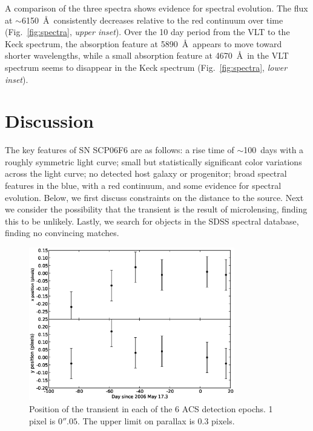 A comparison of the three spectra shows evidence for spectral evolution.
The flux at 
$\sim$6150~\AA\ consistently decreases relative to the red continuum over time
(Fig.~\ref{fig:spectra}, \emph{upper inset}).
Over the 10 day period from the VLT to the Keck spectrum, 
the absorption feature at 5890~\AA\ appears to move toward shorter wavelengths,
while a small absorption feature at 4670~\AA\ in the VLT spectrum 
seems to disappear in the Keck spectrum
(Fig.~\ref{fig:spectra}, \emph{lower inset}).


\section{Discussion} \label{sec:f6_discussion}

The key features of SN SCP06F6 are as follows: a rise time of
$\sim$100~days with a roughly symmetric light curve; small but
statistically significant color variations across the light curve; no
detected host galaxy or progenitor; broad spectral features in the
blue, with a red continuum, and some evidence for spectral evolution.
Below, we first discuss constraints on the distance to the source.
Next we consider the possibility that the transient is the result of
microlensing, finding this to be unlikely.  Lastly, we search for
objects in the SDSS spectral database, finding no convincing matches.

\begin{figure}[tbh]
\begin{center}
\includegraphics[width=0.8\textwidth]{figures/scp06f6/propmotion.eps}
\end{center}
\caption[Proper motion of SN SCP06F6]{Position of the transient in
  each of the 6 ACS detection epochs.  1 pixel is $0''.05$. The upper
  limit on parallax is 0.3 pixels.\label{fig:propmotion}}
\end{figure}

